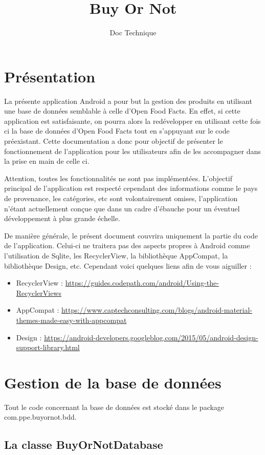 \documentclass[report]{BetterDocument}
\title{Buy Or Not}
\subtitle{Doc Technique}
\date{}
\newcommand{\ofc}{Open Food Facts}
\newcommand{\bdd}{base de données}
\begin{document}
	\pageDeGarde

	\tableDesMatieres

	\chapter{Présentation}

	La présente application Android a pour but la gestion des produits en utilisant une \bdd{} semblable à celle d'\ofc{}. En effet, si cette application est satisfaisante, on pourra alors la redévelopper en utilisant cette fois ci la \bdd{} d'\ofc{} tout en s'appuyant sur le code préexistant. Cette documentation a donc pour objectif de présenter le fonctionnement de l'application pour les utilisateurs afin de les accompagner dans la prise en main de celle ci.

	Attention, toutes les fonctionnalités ne sont pas implémentées. L'objectif principal de l'application est respecté cependant des informations comme le pays de provenance, les catégories, etc sont volontairement omises, l'application n'étant actuellement conçue que dans un cadre d'ébauche pour un éventuel développement à plus grande échelle.

	De manière générale, le présent document couvrira uniquement la partie du code de l'application. Celui-ci ne traitera pas des aspects propres à Android comme l'utilisation de Sqlite, les RecyclerView, la bibliothèque AppCompat, la bibliothèque Design, etc. Cependant voici quelques liens afin de vous aiguiller :

	\begin{itemize}
		\item RecyclerView : \url{https://guides.codepath.com/android/Using-the-RecyclerViews}
		\item AppCompat : \url{https://www.captechconsulting.com/blogs/android-material-themes-made-easy-with-appcompat}
		\item Design : \url{https://android-developers.googleblog.com/2015/05/android-design-support-library.html}
	\end{itemize}

	\chapter{Gestion de la \bdd{}}

		Tout le code concernant la \bdd{} est stocké dans le package com.ppe.buyornot.bdd.

		\section{La classe BuyOrNotDatabase}
\end{document}
